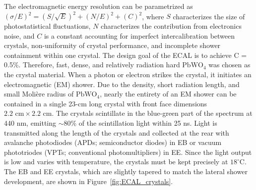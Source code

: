 \documentclass[dissertation.tex]{subfiles}
\begin{document}
The electromagnetic energy resolution can be parametrized as $(\sigma/E)^{2} = (S/\sqrt{E})^{2} + (N/E)^{2} + (C)^{2}$, where $S$ characterizes the size of photostatistical fluctuations, $N$ characterizes the contribution from electronics noise, and $C$ is a constant accounting for imperfect intercalibration between crystals, non-uniformity of crystal performance, and incomplete shower containment within one crystal.  The design goal of the ECAL is to achieve C = 0.5\%.  Therefore, fast, dense, and relatively radiation hard $\mbox{PbWO}_{4}$ was chosen as the crystal material.  When a photon or electron strikes the crystal, it initiates an electromagnetic (EM) shower.  Due to the density, short radiation length, and small Moli\`ere radius of $\mbox{PbWO}_{4}$, nearly the entirety of an EM shower can be contained in a single 23-cm long crystal with front face dimensions $2.2\mbox{ cm}\times2.2\mbox{ cm}$.  The crystals scintillate in the blue-green part of the spectrum at 440 nm, emitting $\sim80$\% of the scintillation light within 25 ns.  Light is transmitted along the length of the crystals and collected at the rear with avalanche photodiodes (APDs; semiconductor diodes) in EB or vacuum phototriodes (VPTs; conventional photomultipliers) in EE.  Since the light output is low and varies with temperature, the crystals must be kept precisely at $18^{\circ}$C.  The EB and EE crystals, which are slightly tapered to match the lateral shower development, are shown in Figure~\ref{fig:ECAL_crystals}.
\end{document}
